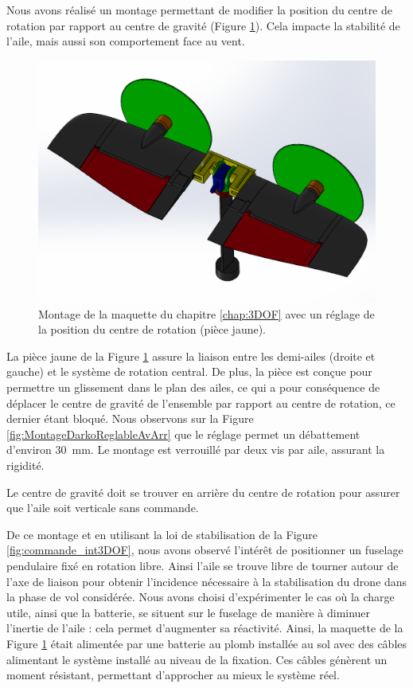 Nous avons réalisé un montage permettant de modifier la position du centre de rotation par rapport au centre de gravité (Figure \ref{fig:MontageDarkoReglable}). Cela impacte la stabilité de l'aile, mais aussi son comportement face au vent. 

\begin{figure}[ht!]
    \centering
   \includegraphics[width=0.7\columnwidth]{figures/vueMaquetteDarkoReglage.png}
    \caption{Montage de la maquette du chapitre \ref{chap:3DOF} avec un réglage de la position du centre de rotation (pièce jaune).}
    \label{fig:MontageDarkoReglable}
\end{figure}

La pièce jaune de la Figure \ref{fig:MontageDarkoReglable} assure la liaison entre les demi-ailes (droite et gauche) et le système de rotation central. De plus, la pièce est conçue pour permettre un glissement dans le plan des ailes, ce qui a pour conséquence de déplacer le centre de gravité de l'ensemble par rapport au centre de rotation, ce dernier étant bloqué. Nous observons sur la Figure \ref{fig:MontageDarkoReglableAvArr} que le réglage permet un débattement d'environ \SI{30}{\milli\meter}. Le montage est verrouillé par deux vis par aile, assurant la rigidité.

Le centre de gravité doit se trouver en arrière du centre de rotation pour assurer que l'aile soit verticale sans commande.

De ce montage et en utilisant la loi de stabilisation de la Figure \ref{fig:commande_int3DOF}, nous avons observé l'intérêt de positionner un fuselage pendulaire fixé en rotation libre. Ainsi l'aile se trouve libre de tourner autour de l'axe de liaison pour obtenir l'incidence nécessaire à la stabilisation du drone dans la phase de vol considérée. Nous avons choisi d'expérimenter le cas où la charge utile, ainsi que la batterie, se situent sur le fuselage de manière à diminuer l'inertie de l'aile : cela permet d'augmenter sa réactivité. Ainsi, la maquette de la Figure \ref{fig:MontageDarkoReglable} était alimentée par une batterie au plomb installée au sol avec des câbles alimentant le système installé au niveau de la fixation. Ces câbles génèrent un moment résistant, permettant d'approcher au mieux le système réel.

